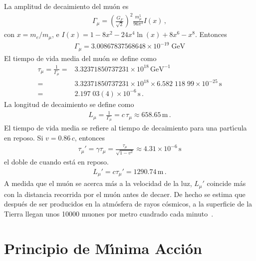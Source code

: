 \begin{frame}
\begin{example}
  La amplitud de decaimiento del mu\'on es
    \begin{align}
      \Gamma_\mu=\left(\frac{G_F}{\sqrt{2}}\right)^2\frac{m_\mu^5}{96\pi^3}I\left(x\right)\,,
    \end{align}
    con $x=m_e/m_\mu$, e $I(x)=1-8x^2-24x^4\ln(x)+8x^6-x^8$.
    Entonces
    \begin{align}
      \Gamma_\mu=3.00867837568648 \times 10^{- 19} \; \text{GeV}
    \end{align}
    El tiempo de vida media del mu\'on se define como
    \begin{align}
      \tau_\mu=\frac{1}{\Gamma_\mu}=&3.32371850737231\times10^{18}\,\text{GeV}^{-1}\nonumber\\
      =&3.32371850737231\times10^{18}\times6.582\;118\;99\times10^{-25}\,\text{s}\nonumber\\
      =&2.197\;03(4)\times10^{-6}\,\text{s}\,.
    \end{align}
La longitud de decaimiento se define como
\begin{align}
  L_\mu=\frac{1}{\Gamma_\mu}=c\,\tau_\mu\approx658.65\,\text{m}\,.
\end{align}
El tiempo de vida media se refiere al tiempo de decaimiento para una part\'\i cula en reposo. Si $v=0.86\,c$, entonces
\begin{align}
  \tau_\mu'=\gamma\tau_\mu=\frac{\tau_\mu}{\sqrt{1-v^2}}\approx4.31\times10^{-6}\,\text{s}
\end{align}
el doble de cuando est\'a en reposo. 
\begin{align}
  L_\mu'=c\tau_\mu'=1290.74\,\text{m}\,.
\end{align}
A medida que el mu\'on se acerca m\'as a la velocidad de la luz, $L_\mu'$ coincide m\'as con la distancia recorrida por el mu\'on antes de decaer. De hecho se estima que despu\'es de ser producidos en la atm\'osfera de rayos c\'osmicos, a la superficie de la Tierra llegan unos 10000 muones por metro cuadrado cada minuto~\cite{muon}.

\end{example}

\end{frame}

\section{Principio de M\'\i nima Acci\'on}
\label{sec:la}

